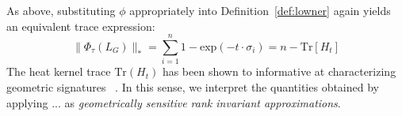 \documentclass[10pt]{article}
\numberwithin{equation}{section}
\newcommand{\+}{%
	\raisebox{0.18ex}{\scaleobj{0.55}{+}}
}
\theoremstyle{definition}
\theoremstyle{definition}
\begin{document}
As above, substituting $\phi$ appropriately into Definition~\eqref{def:lowner} again yields an equivalent trace expression:
\begin{equation}\label{eq:heat_trace}
	\lVert \Phi_\tau(L_G) \rVert_\ast = \sum\limits_{i = 1}^n 1 - \mathrm{exp}(-t \cdot \sigma_i) = n - \mathrm{Tr}\left[H_t\right]
\end{equation}
The heat kernel trace $\mathrm{Tr}(H_t)$ has been shown to informative at characterizing geometric signatures ~\cite{}. 
In this sense, we interpret the quantities obtained by applying ... as \emph{geometrically sensitive rank invariant approximations}.

  
 
 
%
\end{document}
